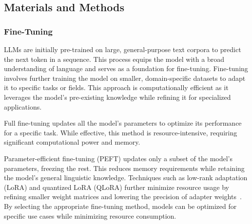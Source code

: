 \subsection{Materials and Methods}
\label{subsec:materials-and-methods-rag}

\subsubsection{Fine-Tuning}
\glspl{LLM} are initially pre-trained on large, general-purpose text corpora to predict the next token in a sequence.
%
This process equips the model with a broad understanding of language and serves as a foundation for fine-tuning.
%
Fine-tuning involves further training the model on smaller, domain-specific datasets to adapt it to specific tasks or fields.
%
This approach is computationally efficient as it leverages the model's pre-existing knowledge while refining it for specialized applications.

Full fine-tuning updates all the model's parameters to optimize its performance for a specific task.
%
While effective, this method is resource-intensive, requiring significant computational power and memory.

Parameter-efficient fine-tuning (PEFT) updates only a subset of the model's parameters, freezing the rest.
%
This reduces memory requirements while retaining the model's general linguistic knowledge.
%
Techniques such as low-rank adaptation (LoRA) and quantized LoRA (QLoRA) further minimize resource usage by refining smaller weight matrices and lowering the precision of adapter weights~\cite{PLACEHOLDER1, PLACEHOLDER2}.
%
By selecting the appropriate fine-tuning method, models can be optimized for specific use cases while minimizing resource consumption.

